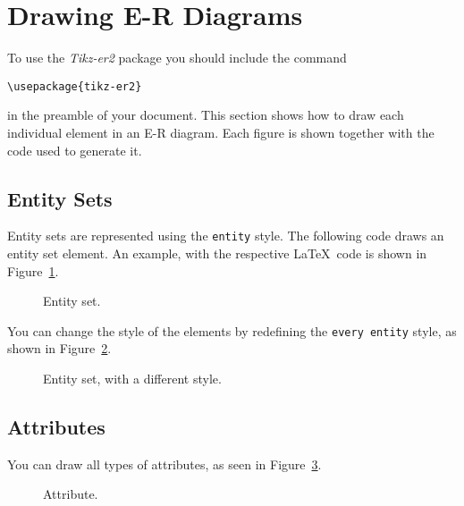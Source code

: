 \documentclass[12pt]{article}
\newcommand{\demo}[1]{
  \bigskip
  \begin{minipage}{\linewidth}
      \begin{center}
          
      \end{center}
      \begin{center}
          
      \end{center}
  \end{minipage}
}
\begin{document}
\section{Drawing E-R Diagrams}
\label{sec:drawing-e-r}

To use the \emph{Tikz-er2} package you should include the command
\begin{center}
    \ttfamily
    \verb+\usepackage{tikz-er2}+
\end{center}
in the preamble of your document. This section shows how to draw each individual
element in an E-R diagram. Each figure is shown together with the code used to
generate it.

%

\subsection{Entity Sets}
\label{sec:entities}

Entity sets are represented using the \texttt{entity} style. The following code
draws an entity set element. An example, with the respective \LaTeX\ code is
shown in Figure~\ref{fig:entity}.

\begin{figure}[htb!]
    \centering
    \demo{entity}
    \caption{Entity set.}
\label{fig:entity}
\end{figure}

You can change the style of the elements by redefining the \texttt{every
  entity} style, as shown in Figure~\ref{fig:entity-blue}.

\begin{figure}[htb!]
    \centering
    \demo{entity-blue}
    \caption{Entity set, with a different style.}
\label{fig:entity-blue}
\end{figure}

%

\subsection{Attributes}
\label{sec:attributes}

You can draw all types of attributes, as seen in Figure~\ref{fig:attribute}.

\begin{figure}[htb!]
    \centering
    \demo{attribute}
    \caption{Attribute.}
\label{fig:attribute}
\end{figure}
\end{document}
